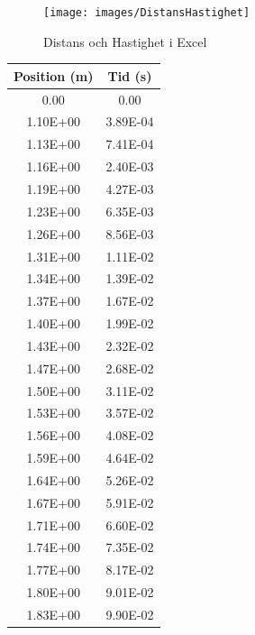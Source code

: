 \documentclass[11p, titlepage, oneside, a4paper]{article}
\begin{document}
        \begin{figure}[!h]
            \centering
            \texttt{[image: images/DistansHastighet]}
            \caption{Distans och Hastighet i Excel}
            \label{fig:distanshastighet}
        \end{figure}






    \begin{table}
            \begin{center}
            \begin{tabular}{ |c|c| }
            \hline
            Position (m) & Tid (s)  \\
            \hline
                0.00 & 0.00 \\
                1.10E+00 & 3.89E-04 \\
                1.13E+00 & 7.41E-04 \\
                1.16E+00 & 2.40E-03 \\
                1.19E+00 & 4.27E-03 \\
                1.23E+00 & 6.35E-03 \\
                1.26E+00 & 8.56E-03 \\
                1.31E+00 & 1.11E-02 \\
                1.34E+00 & 1.39E-02 \\
                1.37E+00 & 1.67E-02 \\
                1.40E+00 & 1.99E-02 \\
                1.43E+00 & 2.32E-02 \\
                1.47E+00 & 2.68E-02 \\
                1.50E+00 & 3.11E-02 \\
                1.53E+00 & 3.57E-02 \\
                1.56E+00 & 4.08E-02 \\
                1.59E+00 & 4.64E-02 \\
                1.64E+00 & 5.26E-02 \\
                1.67E+00 & 5.91E-02 \\
                1.71E+00 & 6.60E-02 \\
                1.74E+00 & 7.35E-02 \\
                1.77E+00 & 8.17E-02 \\
                1.80E+00 & 9.01E-02 \\
                1.83E+00 & 9.90E-02 \\

\end{tabular}
\end{center}
\end{table}
\end{document}
